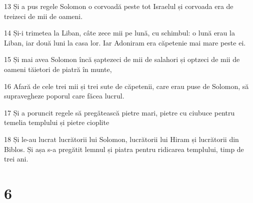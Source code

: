 \par 13 Și a pus regele Solomon o corvoadă peste tot Israelul și corvoada era de treizeci de mii de oameni.
\par 14 Și-i trimetea la Liban, câte zece mii pe lună, cu schimbul: o lună erau la Liban, iar două luni la casa lor. Iar Adoniram era căpetenie mai mare peste ei.
\par 15 Și mai avea Solomon încă șaptezeci de mii de salahori și optzeci de mii de oameni tăietori de piatră în munte,
\par 16 Afară de cele trei mii și trei sute de căpetenii, care erau puse de Solomon, să supravegheze poporul care făcea lucrul.
\par 17 Și a poruncit regele să pregătească pietre mari, pietre cu ciubuce pentru temelia templului și pietre cioplite
\par 18 Și le-au lucrat lucrătorii lui Solomon, lucrătorii lui Hiram și lucrătorii din Biblos. Și așa s-a pregătit lemnul și piatra pentru ridicarea templului, timp de trei ani.

\chapter{6}

